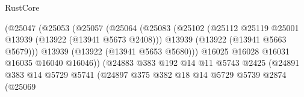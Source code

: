 \begin{lexlean}{RustCore}
\begin{coremodule}
                                              (@25047
                                                (@25053
                                                  (@25057
                                                    (@25064
                                                      (@25083
                                                        (@25102
                                                          (@25112
                                                            @25119
                                                            @25001
                                                            @13939
                                                            (@13922 (@13941 @5673 @2408)))
                                                          @13939
                                                          (@13922 (@13941 @5663 @5679)))
                                                        @13939
                                                        (@13922 (@13941 @5653 @5680)))
                                                      @16025
                                                      @16028
                                                      @16031
                                                      @16035
                                                      @16040
                                                      @16046))
                                                  (@24883
                                                    @383
                                                    @192
                                                    @14
                                                    @11
                                                    @5743
                                                    @2425
                                                    (@24891
                                                      @383
                                                      @14
                                                      @5729
                                                      @5741
                                                      (@24897
                                                        @375
                                                        @382
                                                        @18
                                                        @14
                                                        @5729
                                                        @5739
                                                        @2874
                                                        (@25069

\end{coremodule}
\end{lexlean}
